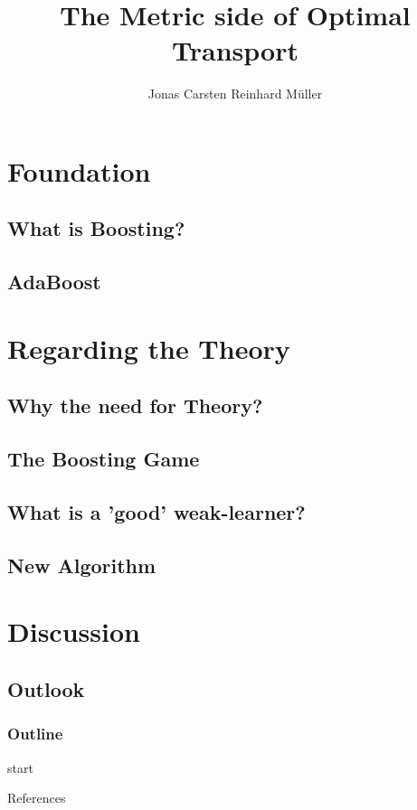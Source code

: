 \documentclass{beamer}
\author[Jonas Müller]{Jonas Carsten Reinhard Müller}
\begin{document}
\title[Wasserstein Metric]{The Metric side of Optimal Transport}
\institute{}
\date{}

\begin{frame}
    \titlepage
\end{frame}


\section{Foundation}
\subsection{What is Boosting?}
\subsection{AdaBoost}
\section{Regarding the Theory}
\subsection{Why the need for Theory?}
\subsection{The Boosting Game}
\subsection{What is a 'good' weak-learner?}
\subsection{New Algorithm}
\section{Discussion}
\subsection{Outlook}


\begin{frame}
    \frametitle{Outline}
    \tableofcontents
\end{frame}




\begin{frame}{}
    start
\end{frame}

\begin{frame}{References}
    \printbibliography
\end{frame}

\end{document}
